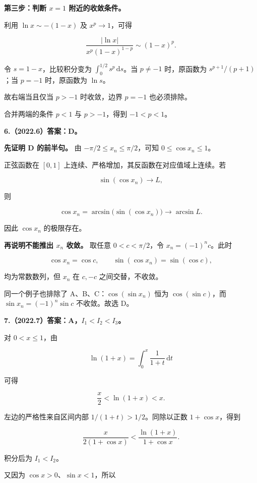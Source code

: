 \documentclass[UTF8,11pt,fontset=windows]{ctexart}
\begin{document}
\textbf{第三步：判断 $x=1$ 附近的收敛条件。}

利用 $\ln x\sim-(1-x)$ 及 $x^p\to1$，可得

$$
\frac{|\ln x|}{x^p(1-x)^{1-p}}\sim(1-x)^p.
$$

令 $s=1-x$，比较积分变为 $\int_0^{1/2}s^p\,\mathrm ds$。当 $p\ne-1$ 时，原函数为 $s^{p+1}/(p+1)$；当 $p=-1$ 时，原函数为 $\ln s$。

故右端当且仅当 $p>-1$ 时收敛，边界 $p=-1$ 也必须排除。

合并两端的条件 $p<1$ 与 $p>-1$，得到 $\boxed{-1<p<1}$。

\clearpage

\textbf{6.（2022.6）答案：D。}

\textbf{先证明 D 的前半句。} 由 $-\pi/2\le x_n\le\pi/2$，可知 $0\le\cos x_n\le1$。

正弦函数在 $[0,1]$ 上连续、严格增加，其反函数在对应值域上连续。若

$$
\sin(\cos x_n)\longrightarrow L,
$$

则

$$
\cos x_n=\arcsin\bigl(\sin(\cos x_n)\bigr)
\longrightarrow\arcsin L.
$$

因此 $\cos x_n$ 的极限存在。

\textbf{再说明不能推出 $x_n$ 收敛。} 取任意 $0<c<\pi/2$，令 $x_n=(-1)^nc$。此时

$$
\cos x_n=\cos c,
\qquad\sin(\cos x_n)=\sin(\cos c),
$$

均为常数数列，但 $x_n$ 在 $c,-c$ 之间交替，不收敛。

同一个例子也排除了 A、B、C：$\cos(\sin x_n)$ 恒为 $\cos(\sin c)$，而 $\sin x_n=(-1)^n\sin c$ 不收敛。故选 D。

\clearpage

\textbf{7.（2022.7）答案：A，$I_1<I_2<I_3$。}

对 $0<x\le1$，由

$$
\ln(1+x)=\int_0^x\frac1{1+t}\,\mathrm dt
$$

可得

$$
\frac{x}{2}<\ln(1+x)<x.
$$

左边的严格性来自区间内部 $1/(1+t)>1/2$。同除以正数 $1+\cos x$，得到

$$
\frac{x}{2(1+\cos x)}
<\frac{\ln(1+x)}{1+\cos x}.
$$

积分后为 $I_1<I_2$。

又因为 $\cos x>0$、$\sin x<1$，所以
\end{document}
